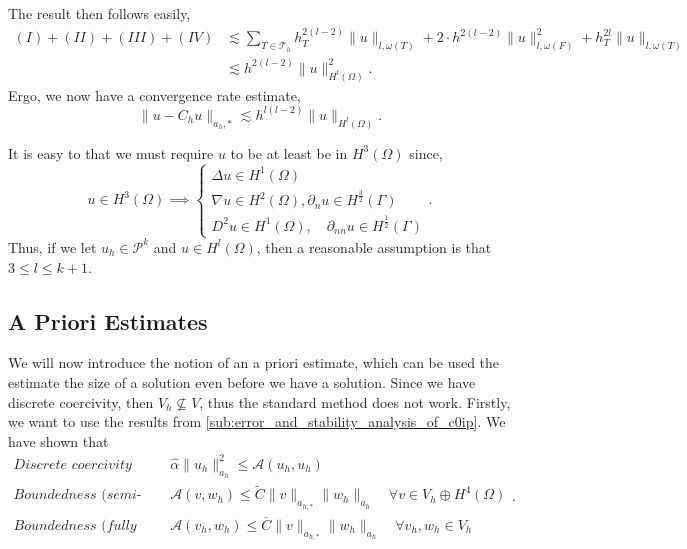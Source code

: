  The result then follows easily,
\[
    \begin{split}
        (I) + (II) + (III) +  (IV)  &  \lesssim  \sum_{T \in \mathcal{T} _{h}}^{}  h_{T}^{2\left( l-2 \right) } \| u \|_{l, \omega \left( T \right)   }^{  } +   2\cdot h^{2(l-2)}  \| u \|_{ l, \omega \left( F \right)  }^{ 2 } + h_{T}^{2l} \| u \|_{l, \omega \left( T \right)}
        \\
        &  \lesssim  h^{2\left( l-2 \right) } \| u \|_{ H^{l}\left( \Omega  \right)  }^{2  }.
    \end{split}
\]
Ergo, we now have a convergence rate estimate,
\[
\| u - C_{h}u \|_{a_{h},*  }^{  } \lesssim  h^{l(l-2)} \| u \|_{H^{l} \left( \Omega  \right)  }^{  }.
\]



It is easy to that we must require $u$ to be at least be in $H^{3}\left( \Omega  \right) $ since,
\[
u \in H^3\left( \Omega  \right)  \implies \begin{cases}
    \Delta u \in  H^{1}\left( \Omega  \right ) \\
    \nabla u \in H^2\left( \Omega  \right), \partial _{n} u \in H^{\frac{3}{2}}\left( \Gamma  \right) \\
    D^2u \in H^{1} \left( \Omega  \right), \quad  \partial _{nn}u \in  H^{\frac{1}{2}}\left( \Gamma  \right)
\end{cases}.
\]
Thus, if we let $u_{h} \in \mathcal{P} ^{k}$ and $u \in  H^{l}\left( \Omega  \right) $, then a reasonable assumption is that $3 \le  l \le k+1$.



\subsection{A Priori Estimates}%
\label{sub:apriori_estimates}

We will now introduce the notion of an a priori estimate, which can be used the estimate the size of a solution even before we have a solution. Since we have discrete coercivity, then $V_{h} \not \subseteq  V$, thus the standard method does not work. Firstly, we want to use the results from \ref{sub:error_and_stability_analysis_of_c0ip}. We have shown that
\begin{equation*}
    \begin{split}
    \textit{Discrete coercivity } \quad & \hat{\alpha } \| u_{h} \|_{ a_{h} }^{ 2 }  \le  \mathcal{A} \left( u_{h}, u_{h} \right) \\
    \textit{Boundedness (semi-discrete) }\quad  & \mathcal{A} \left( v,w_{h} \right)  \le  \widetilde{C} \| v \|_{ a_{h,*} }^{  }  \| w_{h} \|_{ a_{h} }^{  } \quad \forall v \in  V_{h} \oplus H^{4}\left( \Omega  \right) \\
    \textit{Boundedness (fully discrete) }\quad  & \mathcal{A} \left( v_{h},w_{h} \right)  \le  \overline{C}  \| v \|_{ a_{h,*} }^{  }  \| w_{h} \|_{ a_{h} }^{  } \quad \forall v_{h}, w_{h} \in V_{h}
    \end{split}
.\end{equation*}

